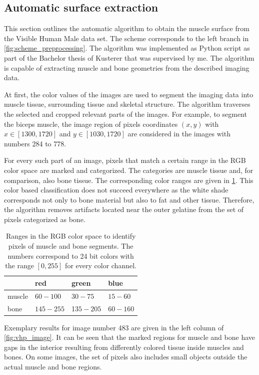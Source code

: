 \subsection{Automatic surface extraction}
This section outlines the automatic algorithm to obtain the muscle surface from the Visible Human Male data set. The scheme corresponds to the left branch in \cref{fig:scheme_preprocessing}. The algorithm was implemented as Python script as part of the Bachelor thesis of Kusterer \cite{Kusterer} that was supervised by me.
The algorithm is capable of extracting muscle and bone geometries from the described imaging data.

At first, the color values of the images are used to segment the imaging data into muscle tissue, surrounding tissue and skeletal structure. The algorithm traverses the selected and cropped relevant parts of the images. For example, to segment the biceps muscle, the image region of pixels coordinates $(x,y)$ with $x \in [1300,1720] $ and $ y\in[1030,1720]$ are considered in the images with numbers 284 to 778. 

For every such part of an image, pixels that match a certain range in the RGB color space are marked and categorized. The categories are muscle tissue and, for comparison, also bone tissue. The corresponding color ranges are given in \cref{tab:color_ranges}.
This color based classification does not succeed everywhere as the white shade corresponds not only to bone material but also to fat and other tissue. Therefore, the algorithm removes artifacts located near the outer gelatine from the set of pixels categorized as bone. 

\begin{table}
  \centering%
  \begin{tabular}{l|lll}
    \hline
    & red & green & blue\\
    \hline
    muscle & $60 - 100$& $30-75$   & $15-60$\\
    bone   & $145-255$ & 1$35-205$ & $60-160$\\
    \hline
  \end{tabular}
  \caption{Ranges in the RGB color space to identify pixels of muscle and bone segments. The numbers correspond to 24 bit colors with the range $[0,255]$ for every color channel.}%
  \label{tab:color_ranges}%
\end{table}

Exemplary results for image number 483 are given in the left column of \cref{fig:vhp_image}.
It can be seen that the marked regions for muscle and bone have gaps in the interior resulting from differently colored tissue inside muscles and bones. On some images, the set of pixels also includes small objects outside the actual muscle and bone regions.

